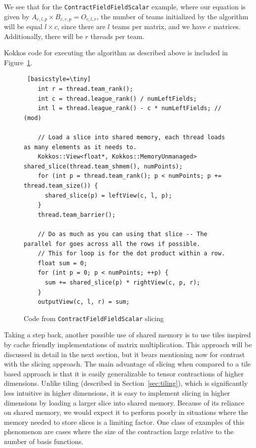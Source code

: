 We see that for the \texttt{ContractFieldFieldScalar} example, where our equation is given by
$A_{c,l,p} \times B_{c, r, p} = O_{c,l, r}$, the
number of teams initialized by the algorithm will be equal $l \times c$,
since there are $l$ teams per matrix, and we have $c$ matrices.
Additionally, there will be $r$ threads per team. 


    Kokkos code for executing the algorithm as described above is included in Figure~\ref{lst:ContractFieldFieldScalarSlice}. 

\begin{figure}[ht]
    \begin{lstlisting} [basicstyle=\tiny]
    int r = thread.team_rank();
    int c = thread.league_rank() / numLeftFields;
    int l = thread.league_rank() - c * numLeftFields; // (mod)

    // Load a slice into shared memory, each thread loads as many elements as it needs to.
    Kokkos::View<float*, Kokkos::MemoryUnmanaged> shared_slice(thread.team_shmem(), numPoints);
    for (int p = thread.team_rank(); p < numPoints; p += thread.team_size()) {
      shared_slice(p) = leftView(c, l, p);
    }
    thread.team_barrier();

    // Do as much as you can using that slice -- The parallel for goes across all the rows if possible.
    // This for loop is for the dot product within a row.
    float sum = 0;
    for (int p = 0; p < numPoints; ++p) {
      sum += shared_slice(p) * rightView(c, p, r);
    }
    outputView(c, l, r) = sum;

   \end{lstlisting}
\caption{Code from \texttt{ContractFieldFieldScalar} slicing
\label{lst:ContractFieldFieldScalarSlice}} 
\end{figure}

    Taking a step back, another possible use of shared memory is to use tiles inspired
    by cache friendly implementations of matrix multiplication. This approach will be discussed
    in detail in the next section, but it bears mentioning now for contrast with the slicing approach. 
    The main advantage of slicing when compared to a tile based approach is that it is easily generalizable to
tensor contractions of higher dimensions. Unlike tiling (described in Section~\ref{sec:tiling}), which is significantly
less intuitive in higher dimensions, it is easy to implement slicing in higher
dimensions by loading a larger slice into shared memory. Because of its
reliance on shared memory, we would expect it to perform poorly in situations where the memory
needed to store slices is a limiting factor. One class of examples of this phenomenon are cases where the size of the contraction large relative to the number of basis functions. 

